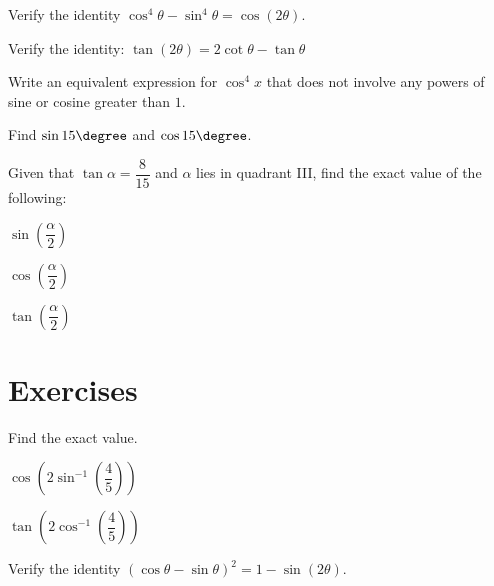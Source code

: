 \newpage

\begin{example}
  Verify the identity ${\cos}^4\theta-{\sin}^4 \theta=\cos(2\theta)$.
\end{example}

\begin{example}
  Verify the identity:  $\tan(2\theta)=2\cot\theta-\tan\theta$
\end{example}

\begin{example}
  Write an equivalent expression for $\cos^4 x$ that does not involve any powers of sine or cosine greater than $1$.
\end{example}

\newpage

\begin{example}
  Find $\sin 15\degree$ and $\cos 15\degree$.
\end{example}

\begin{example}
  Given that $\tan\alpha=\dfrac{8}{15}$ and $\alpha$ lies in quadrant III, find the exact value of the following:\\
\begin{enumerate*}
  \item $\sin\left(\dfrac{\alpha}{2}\right)$
  \item $\cos\left(\dfrac{\alpha}{2}\right)$
  \item  $\tan\left(\dfrac{\alpha}{2}\right)$
\end{enumerate*}
\end{example}

\newpage

\section*{Exercises}

\begin{exercise}
  Find the exact value.\\
  \begin{enumerate*}
    \item $\cos\left(2\sin^{-1}\left(\dfrac{4}{5}\right)\right)$
    \item $\tan\left(2\cos^{-1}\left(\dfrac{4}{5}\right)\right)$
  \end{enumerate*}
\end{exercise}

\begin{exercise}
  Verify the identity $(\cos\theta-\sin\theta)^2=1-\sin(2\theta)$.
\end{exercise}

